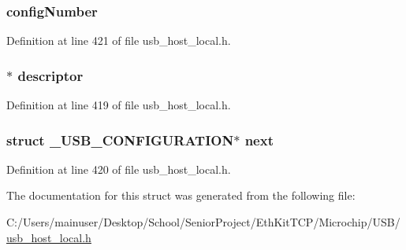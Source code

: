 \subsubsection[{config\+Number}]{ config\+Number}\label{struct___u_s_b___c_o_n_f_i_g_u_r_a_t_i_o_n_acbfe044246f8584a96399a81fe826dd8}


Definition at line 421 of file usb\+\_\+host\+\_\+local.\+h.

\hypertarget{struct___u_s_b___c_o_n_f_i_g_u_r_a_t_i_o_n_ad9d15342c1363ab2657844da30a05bb0}{}
\subsubsection[{descriptor}]{$\ast$ descriptor}\label{struct___u_s_b___c_o_n_f_i_g_u_r_a_t_i_o_n_ad9d15342c1363ab2657844da30a05bb0}


Definition at line 419 of file usb\+\_\+host\+\_\+local.\+h.

\hypertarget{struct___u_s_b___c_o_n_f_i_g_u_r_a_t_i_o_n_a230b8d7f81f5b4d0961b5214977cf6b4}{}
\subsubsection[{next}]{\setlength{\rightskip}{0pt plus 5cm}struct {\bf \+\_\+\+U\+S\+B\+\_\+\+C\+O\+N\+F\+I\+G\+U\+R\+A\+T\+I\+O\+N}$\ast$ next}\label{struct___u_s_b___c_o_n_f_i_g_u_r_a_t_i_o_n_a230b8d7f81f5b4d0961b5214977cf6b4}


Definition at line 420 of file usb\+\_\+host\+\_\+local.\+h.



The documentation for this struct was generated from the following file\+:\begin{DoxyCompactItemize}
\item 
C\+:/\+Users/mainuser/\+Desktop/\+School/\+Senior\+Project/\+Eth\+Kit\+T\+C\+P/\+Microchip/\+U\+S\+B/\hyperlink{usb__host__local_8h}{usb\+\_\+host\+\_\+local.\+h}\end{DoxyCompactItemize}
